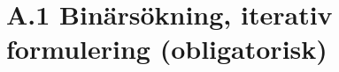 \documentclass{report}
\begin{document}
    \maketitle
    
    \section{A.1 Binärsökning, iterativ formulering (obligatorisk)}
\end{document}
